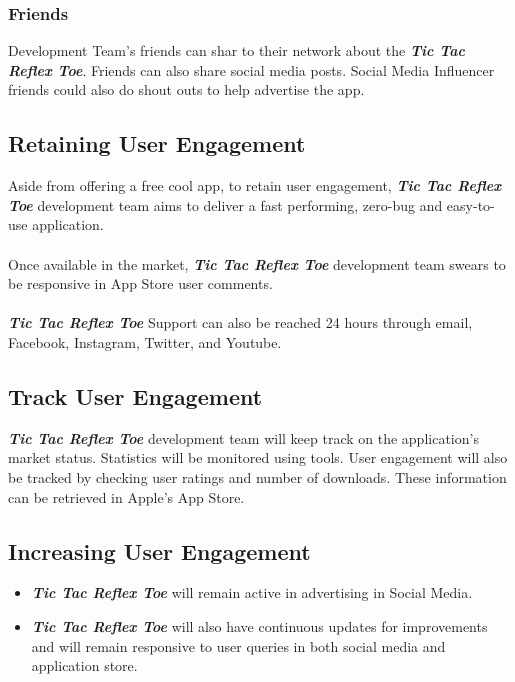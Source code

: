 \documentclass{article}
\begin{document}
    \subsubsection{Friends}
        Development Team's friends can shar to their network about the \textbf{\emph{Tic Tac Reflex Toe}}. Friends can also share social media posts.  Social Media Influencer friends could also do shout outs to help advertise the app.
    ~\newline
\subsection{Retaining User Engagement}
    Aside from offering a free cool app, to retain user engagement, \textbf{\emph{Tic Tac Reflex Toe}} development team aims to deliver a fast performing, zero-bug and easy-to-use application.\\\\
    Once available in the market, \textbf{\emph{Tic Tac Reflex Toe}} development team swears to be responsive in  App Store user comments.\\\\
    \textbf{\emph{Tic Tac Reflex Toe}} Support can also be reached 24 hours through email, Facebook, Instagram, Twitter, and Youtube.
    ~\newline

\subsection{Track User Engagement}
    \textbf{\emph{Tic Tac Reflex Toe}} development team will keep track on the application's market status.  Statistics will be monitored using tools.  User engagement will also be tracked by 
    checking user ratings and number of downloads.  These information can be retrieved in Apple’s App Store.  
    ~\newline
\subsection{Increasing User Engagement}
    \begin{itemize}
        \item \textbf{\emph{Tic Tac Reflex Toe}} will remain active in advertising in Social Media.
        \item \textbf{\emph{Tic Tac Reflex Toe}} will also have continuous updates for improvements and will remain responsive to user queries in both social media and application store.
    \end{itemize}
    
\end{document}
